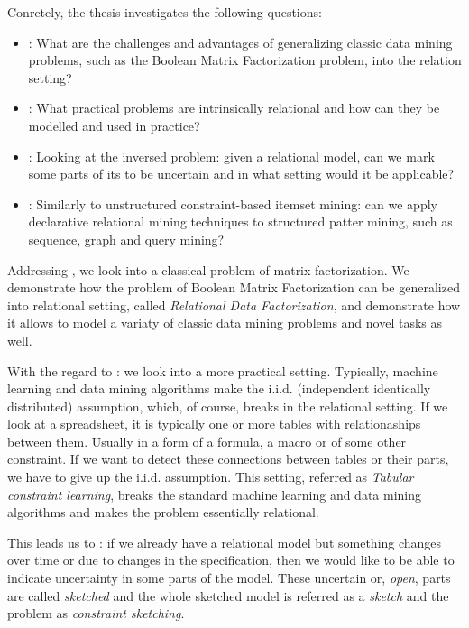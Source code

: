 Conretely, the thesis investigates the following questions:
\begin{itemize}
  \item \cone: What are the challenges and advantages of generalizing
    classic data mining problems, such as the Boolean Matrix
    Factorization problem, into the relation setting?
  \item \ctwo: What practical problems are intrinsically relational and
    how can they be modelled and used in practice?
  \item \cthree: Looking at the inversed problem: given a relational
    model, can we mark some parts of its to be uncertain and in what
    setting would it be applicable?
  \item \cfour: Similarly to unstructured constraint-based itemset
    mining: can we apply declarative relational mining
    techniques to structured patter mining, such as sequence, graph
    and query mining?
\end{itemize}

Addressing \cone, we look into a classical problem of matrix
factorization. We demonstrate how the problem of Boolean Matrix
Factorization can be generalized into relational setting, called
\textit{Relational Data Factorization}, and
demonstrate how it allows to model a variaty of classic data mining
problems and novel tasks as well.

With the regard to \ctwo: we look into a more practical setting.
Typically, machine learning and data mining algorithms make the i.i.d.
(independent identically distributed) assumption, which, of course,
breaks in the relational setting. If we look at a spreadsheet, it is
typically one or more tables with relationaships between them. Usually
in a form of a formula, a macro or of some other constraint. If we
want to detect these connections between tables or their parts, we
have to give up the i.i.d. assumption. This setting, referred as
\textit{Tabular constraint learning}, breaks the standard
machine learning and data mining algorithms and 
makes the problem essentially relational.

This leads us to \cthree: if we already have a relational model but
something changes over time or due to changes in the specification, then we would like
to be able to indicate uncertainty in some parts of the model. These
uncertain or, \textit{open}, parts are called \textit{sketched} and
the whole sketched model is referred as a \textit{sketch} and the
problem as \textit{constraint sketching}.

